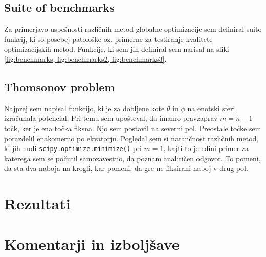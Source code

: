 \documentclass[a4paper]{article}
\begin{document}
\subsection{Suite of benchmarks}
Za primerjavo uspešnosti različnih metod globalne optimizacije sem definiral suito funkcij, ki so posebej
patološke oz. primerne za testiranje kvalitete optimizacijskih metod. Funkcije, ki sem jih definiral sem 
narisal na sliki \ref{fig:benchmarks, fig:benchmarks2, fig:benchmarks3}. \\



\subsection{Thomsonov problem}
Najprej sem napisal funkcijo, ki je za dobljene kote $\theta$ in $\phi$ na enotski sferi izračunala
potencial. Pri temu sem upošteval, da imamo pravzaprav $m = n - 1$ točk, ker je ena točka fiksna. Njo
sem postavil na severni pol. Preostale točke sem porazdelil enakomerno po ekvatorju. Pogledal sem si
natančnost različnih metod, ki jih nudi \texttt{scipy.optimize.minimize()} pri $m=1$, kajti to je edini
primer za katerega sem se počutil samozavestno, da poznam analitičen odgovor. To pomeni, da sta dva naboja 
na krogli, kar pomeni, da gre ne fiksirani naboj v drug pol. \\



\section{Rezultati}


\section{Komentarji in izboljšave}

\newpage


\end{document}
